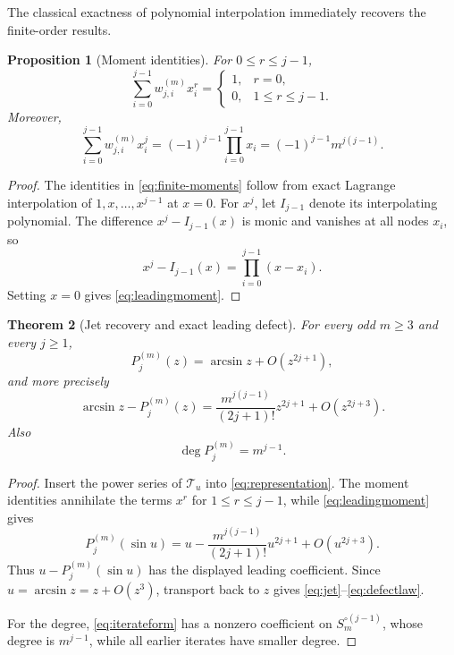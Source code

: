 \documentclass[11pt]{article}
\newtheorem{theorem}{Theorem}[section]
\newtheorem{proposition}[theorem]{Proposition}
\theoremstyle{remark}
\begin{document}
The classical exactness of polynomial interpolation immediately recovers the
finite-order results.

\begin{proposition}[Moment identities]
\label{prop:finite-moments}
For $0\le r\le j-1$,
\begin{equation}
\sum_{i=0}^{j-1}w^{(m)}_{j,i}x_i^r
=
\begin{cases}
1,&r=0,\\
0,&1\le r\le j-1.
\end{cases}
\label{eq:finite-moments}
\end{equation}
Moreover,
\begin{equation}
\sum_{i=0}^{j-1}w^{(m)}_{j,i}x_i^j
=(-1)^{j-1}\prod_{i=0}^{j-1}x_i
=(-1)^{j-1}m^{j(j-1)}.
\label{eq:leadingmoment}
\end{equation}
\end{proposition}

\begin{proof}
The identities in \eqref{eq:finite-moments} follow from exact Lagrange
interpolation of $1,x,\ldots,x^{j-1}$ at $x=0$.  For $x^j$, let $I_{j-1}$
denote its interpolating polynomial.  The difference
$x^j-I_{j-1}(x)$ is monic and vanishes at all nodes $x_i$, so
\[
x^j-I_{j-1}(x)=\prod_{i=0}^{j-1}(x-x_i).
\]
Setting $x=0$ gives \eqref{eq:leadingmoment}.
\end{proof}

\begin{theorem}[Jet recovery and exact leading defect]
\label{thm:finite-defect}
For every odd $m\ge3$ and every $j\ge1$,
\begin{equation}
P^{(m)}_j(z)
=\arcsin z+O(z^{2j+1}),
\label{eq:jet}
\end{equation}
and more precisely
\begin{equation}
\arcsin z-P^{(m)}_j(z)
=
\frac{m^{j(j-1)}}{(2j+1)!}z^{2j+1}
+O(z^{2j+3}).
\label{eq:defectlaw}
\end{equation}
Also
\begin{equation}
\deg P^{(m)}_j=m^{j-1}.
\label{eq:degree}
\end{equation}
\end{theorem}

\begin{proof}
Insert the power series of $\mathcal T_u$ into \eqref{eq:representation}.
The moment identities annihilate the terms $x^r$ for $1\le r\le j-1$, while
\eqref{eq:leadingmoment} gives
\[
P^{(m)}_j(\sin u)
=
u-
\frac{m^{j(j-1)}}{(2j+1)!}u^{2j+1}
+O(u^{2j+3}).
\]
Thus $u-P^{(m)}_j(\sin u)$ has the displayed leading coefficient.  Since
$u=\arcsin z=z+O(z^3)$, transport back to $z$ gives
\eqref{eq:jet}--\eqref{eq:defectlaw}.

For the degree, \eqref{eq:iterateform} has a nonzero coefficient on
$S_m^{\circ(j-1)}$, whose degree is $m^{j-1}$, while all earlier iterates have
smaller degree.
\end{proof}
\end{document}
